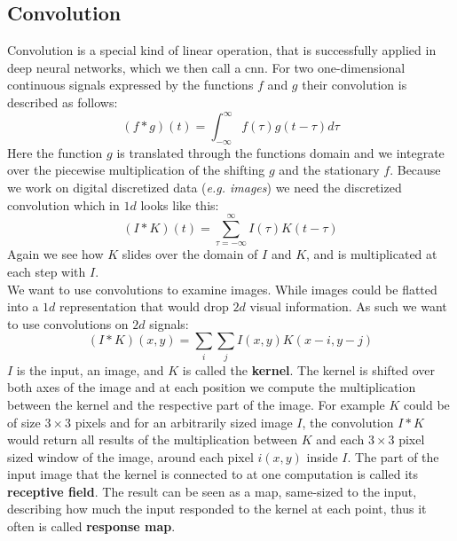 \subsection{Convolution} %
\label{sub:conepts:nn:conv}
Convolution is a special kind of linear operation, that is successfully applied in deep neural networks, which we then call a \acrfull{cnn}. For two one-dimensional continuous signals expressed by the functions $f$ and $g$ their convolution is described as follows:
\begin{equation}
    (f * g)(t) = \int_{-\infty}^\infty f(\tau)g(t - \tau)d\tau
\end{equation}
Here the function $g$ is translated through the functions domain and we integrate over the piecewise multiplication of the shifting $g$ and the stationary $f$.
Because we work on digital discretized data (\textit{e.g. images}) we need the discretized convolution which in $1d$ looks like this:
\begin{equation}
    (I * K)(t)  = \sum_{\tau = - \infty}^\infty I(\tau)K(t - \tau)
\end{equation}
Again we see how $K$ slides over the domain of $I$ and $K$, and is multiplicated at each step with $I$.\\
We want to use convolutions to examine images. While images could be flatted into a $1d$ representation that would drop $2d$ visual information. As such we want to use convolutions on $2d$ signals:
\begin{equation}
    (I * K)(x,y)  = \sum_i\sum_j I(x,y)K(x-i,y-j)
\end{equation}
$I$ is the input, an image, and $K$ is called the \textbf{kernel}. The kernel is shifted over both axes of the image and at each position we compute the multiplication between the kernel and the respective part of the image. For example $K$ could be of size $3\times 3$ pixels and for an arbitrarily sized image $I$, the convolution $I * K$ would return all results of the multiplication between $K$ and each $3 \times 3$ pixel sized window of the image, around each pixel $i(x,y)$ inside $I$. The part of the input image that the kernel is connected to at one computation is called its \textbf{receptive field}. The result can be seen as  a map, same-sized to the input, describing how much the input responded to the kernel at each point, thus it often is called \textbf{response map}.

